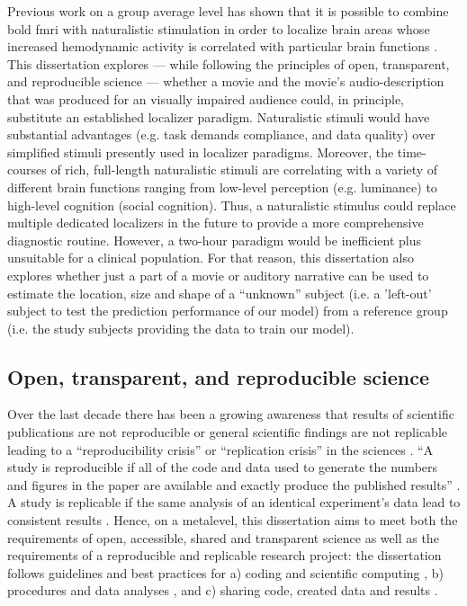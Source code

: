 %
Previous work on a group average level has shown that it is possible to combine
\ac{bold} \ac{fmri} with naturalistic stimulation in order to localize brain
areas whose increased hemodynamic activity is correlated with particular brain
functions \citep{bartels2004mapping}.
%
This dissertation explores --- while following the principles of open,
transparent, and reproducible science --- whether a movie and the movie's
audio-description that was produced for an visually impaired audience could, in
principle, substitute an established localizer paradigm.
%
Naturalistic stimuli would have substantial advantages (e.g. task demands
compliance, and data quality) over simplified stimuli presently used in
localizer paradigms.
%
Moreover, the time-courses of rich, full-length naturalistic stimuli are
correlating with a variety of different brain functions ranging from low-level
perception (e.g.  luminance) to high-level cognition (social cognition).
%
Thus, a naturalistic stimulus could replace multiple dedicated localizers in the
future to provide a more comprehensive diagnostic routine.
%
However, a two-hour paradigm would be inefficient plus unsuitable for a clinical
population.
%
For that reason, this dissertation also explores whether just a part of a movie
or auditory narrative can be used to estimate the location, size and shape of a
``unknown'' subject (i.e. a 'left-out' subject to test the prediction
performance of our model) from a reference group (i.e. the study subjects
providing the data to train our model).


\subsection{Open, transparent, and reproducible science}

Over the last decade there has been a growing awareness that results of
scientific publications are not reproducible or general scientific findings are
not replicable leading to a ``reproducibility crisis'' or ``replication crisis''
in the sciences \citep{baker2016reproducibility, plesser2018reproducibility,
stupple2019reproducibility, nosek2022replicability}.
``A study is reproducible if all of the code and data used to generate the
numbers and figures in the paper are available and exactly produce the published
results'' \citep{leek2017most}.
A study is replicable if the same analysis of an identical experiment's data
lead to consistent results \citep{dubois2016building, leek2017most}.
%
Hence, on a metalevel, this dissertation aims to meet both the requirements of
open, accessible, shared and transparent science \citep{watson2015will,
fecher2014open} as well as the requirements of a reproducible and replicable
research project:
%
the dissertation follows guidelines and best practices for a) coding and
scientific computing \citep{wilson2014best}, b) procedures and data analyses
\citep{nichols2017best, poldrack2017scanning, poldrack2019establishment}, and c)
sharing code, created data and results \citep{eglen2017toward, nichols2017best,
pernet2015improving}.



